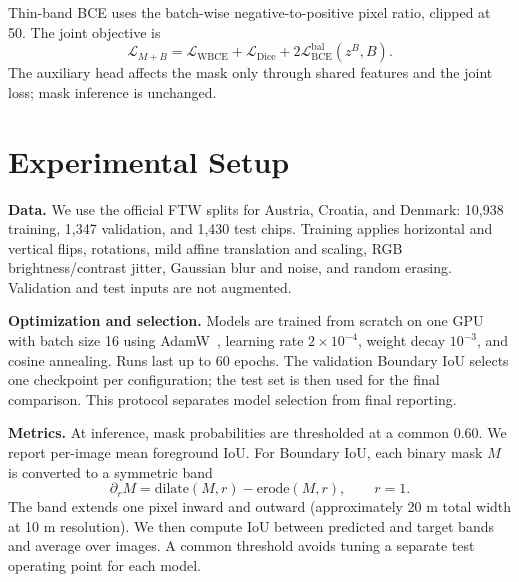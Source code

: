 \documentclass[10pt,twocolumn,letterpaper]{article}
\begin{document}
Thin-band BCE uses the batch-wise negative-to-positive pixel ratio, clipped at 50. The joint objective is
\begin{equation}
  \mathcal{L}_{M+B}=\mathcal{L}_{\mathrm{WBCE}}+
  \mathcal{L}_{\mathrm{Dice}}+2\mathcal{L}^{\mathrm{bal}}_{\mathrm{BCE}}(z^B,B).
\end{equation}
The auxiliary head affects the mask only through shared features and the joint loss; mask inference is unchanged.

\section{Experimental Setup}
\textbf{Data.} We use the official FTW splits for Austria, Croatia, and Denmark: 10,938 training, 1,347 validation, and 1,430 test chips. Training applies horizontal and vertical flips, rotations, mild affine translation and scaling, RGB brightness/contrast jitter, Gaussian blur and noise, and random erasing. Validation and test inputs are not augmented.

\textbf{Optimization and selection.} Models are trained from scratch on one GPU with batch size 16 using AdamW~\cite{loshchilov2019adamw}, learning rate $2\!\times\!10^{-4}$, weight decay $10^{-3}$, and cosine annealing. Runs last up to 60 epochs. The validation Boundary IoU selects one checkpoint per configuration; the test set is then used for the final comparison. This protocol separates model selection from final reporting.

\textbf{Metrics.} At inference, mask probabilities are thresholded at a common 0.60. We report per-image mean foreground IoU. For Boundary IoU, each binary mask $M$ is converted to a symmetric band
\begin{equation}
  \partial_r M=\mathrm{dilate}(M,r)-\mathrm{erode}(M,r),\qquad r=1.
\end{equation}
The band extends one pixel inward and outward (approximately 20 m total width at 10 m resolution). We then compute IoU between predicted and target bands and average over images. A common threshold avoids tuning a separate test operating point for each model.
\end{document}

